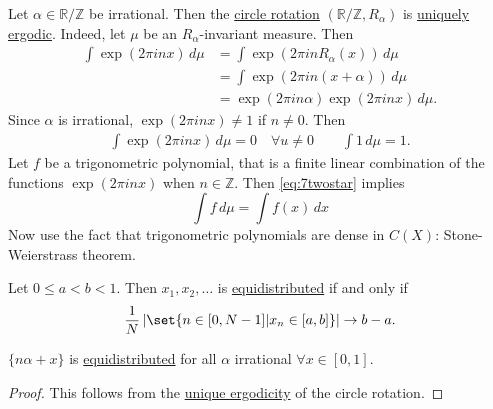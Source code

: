 \documentclass{article}
\newcommand{\named}[1]{\textbf{#1}\index{#1}}
\begin{document}
\begin{eg}
  Let $\alpha \in \mathbb{R}/\mathbb{Z}$ be irrational.
  Then the \hyperlink{def:circ}{circle rotation} $(\mathbb{R}/\mathbb{Z}, R_\alpha)$ is \hyperlink{def:uerg}{uniquely ergodic}.
  Indeed, let $\mu$ be an $R_\alpha$-invariant measure.
  Then
  \begin{align*}
    \int \exp(2 \pi i n x) \, d\mu &= \int \exp(2 \pi i n R_\alpha(x)) \, d\mu  \\
                                   &= \int \exp(2 \pi i n (x+\alpha)) \, d\mu \\
                                   &= \exp(2 \pi i n \alpha) \exp(2\pi i n x) \, d\mu.
  \end{align*}
  Since $\alpha$ is irrational, $\exp(2 \pi i n x) \neq 1$ if $n \neq 0$.
  Then
  \begin{align*}
    \int \exp(2\pi i n x) \, d\mu = 0 \quad \forall u \neq 0 \qquad \int 1\, d\mu = 1. \tag{$**$} \label{eq:7twostar}
  \end{align*}
  Let $f$ be a trigonometric polynomial, that is a finite linear combination of the functions $\exp(2\pi i n x)$ when $n \in \mathbb{Z}$.
  Then \eqref{eq:7twostar} implies
  \begin{equation*}
    \int f \, d\mu = \int f(x) \, dx
  \end{equation*}
  Now use the fact that trigonometric polynomials are dense in $C(X)$: Stone-Weierstrass theorem.
\end{eg}
\begin{defi}[Equidistributed]\hypertarget{def:equid}
  A sequence $x_1, x_2, \dotsc \in [0, 1)$ is said to be \named{equidistributed} if
  \begin{equation*}
    \frac{1}{N} \sum_{n=0}^{N-1} f(x_n) \to \int_{\mathbb{R}/\mathbb{Z}} f(x) \, dx \quad \forall f \in C(\mathbb{R}/\mathbb{Z}).
  \end{equation*}
\end{defi}
\begin{remark}
  Let $0 \leq a < b < 1$. Then $x_1, x_2, \dotsc$ is \hyperlink{def:equid}{equidistributed} if and only if
  \begin{equation*}
    \frac{1}{N} \left\lvert \set{n \in [0, N-1] | x_n \in [a,b]}\right\rvert \to b-a.
  \end{equation*}
\end{remark}
\begin{cor}
  $\{n \alpha + x\}$ is \hyperlink{def:equid}{equidistributed} for all $\alpha$ irrational $\forall x \in [0,1]$.
\end{cor}
\begin{proof}
  This follows from the \hyperlink{def:uerg}{unique ergodicity} of the circle rotation.
\end{proof}
\clearpage
\end{document}

